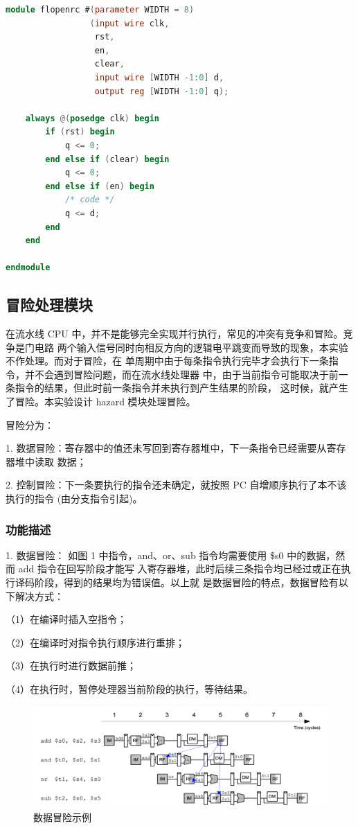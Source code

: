 \begin{lstlisting}[language=Verilog,caption={flopenrc实现},label={lst:flopenrc}]
module flopenrc #(parameter WIDTH = 8)
                 (input wire clk,
                  rst,
                  en,
                  clear,
                  input wire [WIDTH -1:0] d,
                  output reg [WIDTH -1:0] q);
    
    always @(posedge clk) begin
        if (rst) begin
            q <= 0;
        end else if (clear) begin
            q <= 0;
        end else if (en) begin
            /* code */
            q <= d;
        end
    end

endmodule

\end{lstlisting}
\subsection{冒险处理模块}\label{sub:hazard}
在流水线 CPU 中，并不是能够完全实现并行执行，常见的冲突有竞争和冒险。竞争是门电路
两个输入信号同时向相反方向的逻辑电平跳变而导致的现象，本实验不作处理。而对于冒险，在
单周期中由于每条指令执行完毕才会执行下一条指令，并不会遇到冒险问题，而在流水线处理器
中，由于当前指令可能取决于前一条指令的结果，但此时前一条指令并未执行到产生结果的阶段，
这时候，就产生了冒险。本实验设计 hazard 模块处理冒险。

冒险分为：

1. 数据冒险：寄存器中的值还未写回到寄存器堆中，下一条指令已经需要从寄存器堆中读取
数据；

2. 控制冒险：下一条要执行的指令还未确定，就按照 PC 自增顺序执行了本不该执行的指令
(由分支指令引起)。
\subsubsection{功能描述}
1. 数据冒险：
如图 1 中指令，and、or、sub 指令均需要使用 \$s0 中的数据，然而 add 指令在回写阶段才能写
入寄存器堆，此时后续三条指令均已经过或正在执行译码阶段，得到的结果均为错误值。以上就
是数据冒险的特点，数据冒险有以下解决方式：

（1）在编译时插入空指令；

（2）在编译时对指令执行顺序进行重排；

（3）在执行时进行数据前推；

（4）在执行时，暂停处理器当前阶段的执行，等待结果。
\begin{figure}[H]
	\centering
	\includegraphics[width=0.75\linewidth]{figure/数据冒险示例.png}
	\caption{数据冒险示例}
	\label{fig:data_hazard}
	\end{figure}

